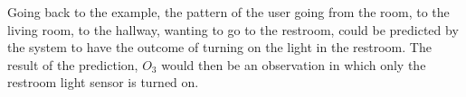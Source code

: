 Going back to the example, the pattern of the user going from the room, to the living room, to the hallway, wanting to go to the restroom, could be predicted by the system to have the outcome of turning on the light in the restroom. The result of the prediction, $O_3$ would then be an observation in which only the restroom light sensor is turned on.

